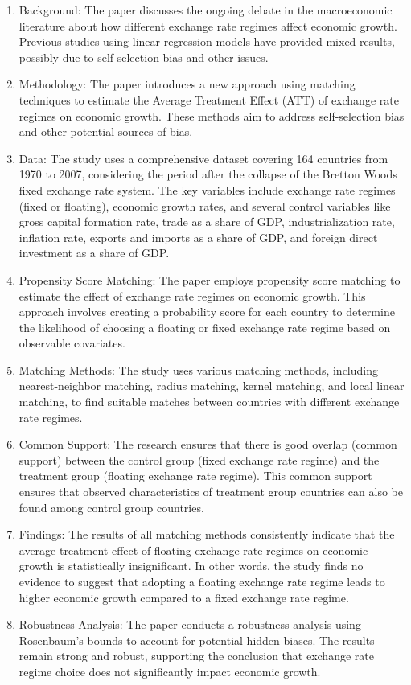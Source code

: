 \documentclass[
  12pt]{article}
\begin{document}
\begin{enumerate}
\def\labelenumi{\arabic{enumi}.}
\item
  Background: The paper discusses the ongoing debate in the
  macroeconomic literature about how different exchange rate regimes
  affect economic growth. Previous studies using linear regression
  models have provided mixed results, possibly due to self-selection
  bias and other issues.
\item
  Methodology: The paper introduces a new approach using matching
  techniques to estimate the Average Treatment Effect (ATT) of exchange
  rate regimes on economic growth. These methods aim to address
  self-selection bias and other potential sources of bias.
\item
  Data: The study uses a comprehensive dataset covering 164 countries
  from 1970 to 2007, considering the period after the collapse of the
  Bretton Woods fixed exchange rate system. The key variables include
  exchange rate regimes (fixed or floating), economic growth rates, and
  several control variables like gross capital formation rate, trade as
  a share of GDP, industrialization rate, inflation rate, exports and
  imports as a share of GDP, and foreign direct investment as a share of
  GDP.
\item
  Propensity Score Matching: The paper employs propensity score matching
  to estimate the effect of exchange rate regimes on economic growth.
  This approach involves creating a probability score for each country
  to determine the likelihood of choosing a floating or fixed exchange
  rate regime based on observable covariates.
\item
  Matching Methods: The study uses various matching methods, including
  nearest-neighbor matching, radius matching, kernel matching, and local
  linear matching, to find suitable matches between countries with
  different exchange rate regimes.
\item
  Common Support: The research ensures that there is good overlap
  (common support) between the control group (fixed exchange rate
  regime) and the treatment group (floating exchange rate regime). This
  common support ensures that observed characteristics of treatment
  group countries can also be found among control group countries.
\item
  Findings: The results of all matching methods consistently indicate
  that the average treatment effect of floating exchange rate regimes on
  economic growth is statistically insignificant. In other words, the
  study finds no evidence to suggest that adopting a floating exchange
  rate regime leads to higher economic growth compared to a fixed
  exchange rate regime.
\item
  Robustness Analysis: The paper conducts a robustness analysis using
  Rosenbaum's bounds to account for potential hidden biases. The results
  remain strong and robust, supporting the conclusion that exchange rate
  regime choice does not significantly impact economic growth.
\end{enumerate}
\end{document}
